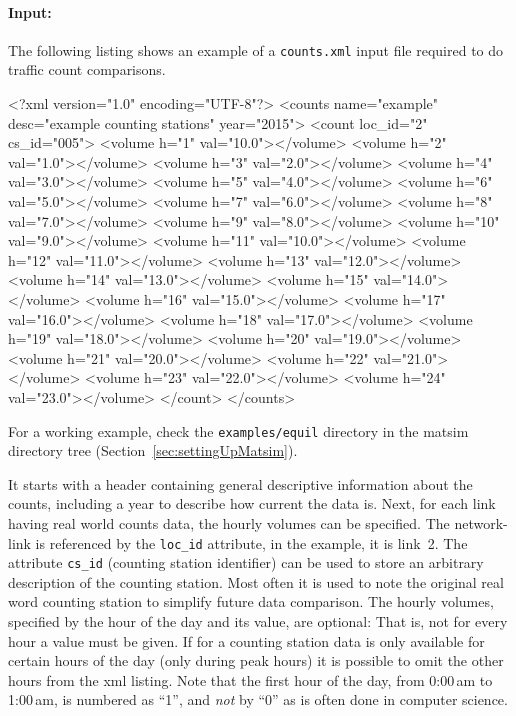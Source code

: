 \paragraph{Input:}
The following listing shows an example of a \lstinline|counts.xml| input file required to do traffic count comparisons. 

\begin{xml}
<?xml version="1.0" encoding="UTF-8"?> 
<counts name="example" desc="example counting stations" year="2015"> 
   <count loc_id="2" cs_id="005"> 
      <volume h="1" val="10.0"></volume> 
      <volume h="2" val="1.0"></volume> 
      <volume h="3" val="2.0"></volume> 
      <volume h="4" val="3.0"></volume> 
      <volume h="5" val="4.0"></volume> 
      <volume h="6" val="5.0"></volume> 
      <volume h="7" val="6.0"></volume> 
      <volume h="8" val="7.0"></volume> 
      <volume h="9" val="8.0"></volume> 
      <volume h="10" val="9.0"></volume> 
      <volume h="11" val="10.0"></volume> 
      <volume h="12" val="11.0"></volume> 
      <volume h="13" val="12.0"></volume> 
      <volume h="14" val="13.0"></volume> 
      <volume h="15" val="14.0"></volume> 
      <volume h="16" val="15.0"></volume> 
      <volume h="17" val="16.0"></volume> 
      <volume h="18" val="17.0"></volume> 
      <volume h="19" val="18.0"></volume> 
      <volume h="20" val="19.0"></volume> 
      <volume h="21" val="20.0"></volume> 
      <volume h="22" val="21.0"></volume> 
      <volume h="23" val="22.0"></volume> 
      <volume h="24" val="23.0"></volume> 
   </count> 
</counts>
\end{xml}
For a working example, check the \lstinline{examples/equil} directory in the \gls{matsim} directory tree (\cf Section~\ref{sec:settingUpMatsim}).

It starts with a header containing general descriptive information about the counts, including a year to describe how current the data is. Next, for each link having real world counts data, the hourly volumes can be specified. The network-link is referenced by the \lstinline|loc_id| attribute, in the example, it is link~2. The attribute \lstinline|cs_id| (counting station identifier) can be used to store an arbitrary description of the counting station. Most often it is used to note the original real word counting station to simplify future data comparison. The hourly volumes, specified by the hour of the day and its value, are optional: That is, not for every hour a value must be given. If for a counting station data is only available for certain hours of the day (\eg only during peak hours) it is possible to omit the other hours from the \gls{xml} listing. Note that the first hour of the day, from 0:00\,am to 1:00\,am, is numbered as ``1'', and \emph{not} by ``0'' as is often done in computer science.

